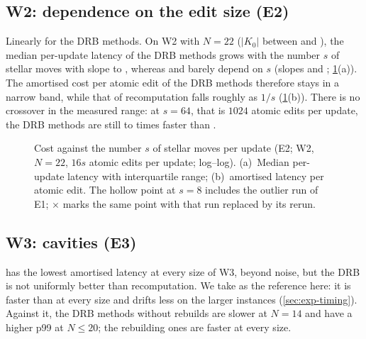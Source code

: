 \subsection{W2: dependence on the edit size (E2)}\label{sec:e2}


Linearly for the DRB methods. On W2 with $N=22$ ($|K_0|$ between
\NumWTwoNTwentyTwoSOneSize{} and \NumWTwoNTwentyTwoSSixtyFourSize), the median
per-update latency of the DRB methods grows with the number $s$ of stellar moves
with slope \NumSlopeETwoWTwoNTwentyTwoDrbIdRbMed{} to
\NumSlopeETwoWTwoNTwentyTwoMmhmMed, whereas  and
 barely depend on $s$ (slopes
\NumSlopeETwoWTwoNTwentyTwoFullIdMed{} and
\NumSlopeETwoWTwoNTwentyTwoFullMorseMed; \cref{fig:edit-size}(a)). The amortised
cost per atomic edit of the DRB methods therefore stays in a narrow band, while
that of recomputation falls roughly as $1/s$ (\cref{fig:edit-size}(b)). There is
no crossover in the measured range: at $s=64$, that is $1024$ atomic edits per
update, the DRB methods are still \NumWTwoNTwentyTwoSSixtyFourMmhmSpeedupFullId{}
to \NumWTwoNTwentyTwoSSixtyFourDrbIdRbSpeedupFullId{} times faster than
.

\begin{figure}[t]
  \centering
  \caption{Cost against the number $s$ of stellar moves per update (E2; W2,
    $N=22$, $16s$ atomic edits per update; log--log). (a)~Median per-update
    latency with interquartile range; (b)~amortised latency per atomic edit. The
    hollow  point at $s=8$ includes the outlier run of E1;
    $\times$ marks the same point with that run replaced by its rerun.}
  \label{fig:edit-size}
\end{figure}

\subsection{W3: cavities (E3)}\label{sec:e3}


 has the lowest amortised latency at every size of W3, beyond
noise, but the DRB is not uniformly better than recomputation. We take
 as the reference here: it is faster than 
at every size and drifts less on the larger instances (\cref{sec:exp-timing}).
Against it, the DRB methods without rebuilds are slower at $N=14$ and have a
higher p99 at $N\le20$; the rebuilding ones are faster at every size.


